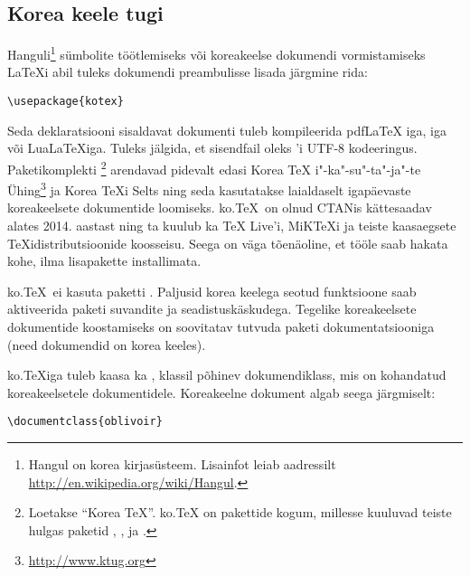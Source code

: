 \subsection[Korea keele tugi]{Korea keele tugi\footnotemark}\label{support_korean}%

Hanguli\footnote{Hangul on korea
kirjasüsteem. Lisainfot leiab aadressilt
\url{http://en.wikipedia.org/wiki/Hangul}.} sümbolite töötlemiseks või
koreakeelse dokumendi vormistamiseks \LaTeX i abil tuleks dokumendi
preambulisse lisada järgmine rida:

\begin{lscommand}
\verb|\usepackage{kotex}|
\end{lscommand}

Seda deklaratsiooni sisaldavat dokumenti tuleb kompileerida pdf\LaTeX
iga, iga või Lua\LaTeX iga. Tuleks jälgida, et
sisendfail oleks 'i UTF-8 kodeeringus. Paketikomplekti
\footnote{Loetakse "`Korea \TeX"'. ko.\TeX{} on pakettide kogum,
millesse kuuluvad teiste hulgas paketid , ,
 ja .} arendavad pidevalt edasi Korea \TeX
i"-ka"-su"-ta"-ja"-te Ühing\footnote{\url{http://www.ktug.org}} ja Korea
\TeX i Selts ning seda kasutatakse laialdaselt igapäevaste koreakeelsete
dokumentide loomiseks. ko.\TeX\ on olnud CTANis kättesaadav alates 2014.
aastast ning ta kuulub ka \TeX{} Live'i,
MiK\TeX i ja teiste kaasaegsete
\TeX idistributsioonide koosseisu. Seega on väga tõenäoline, et tööle
saab hakata kohe, ilma lisapakette installimata.

ko.\TeX\ ei kasuta paketti . Paljusid korea keelega seotud
funktsioone saab aktiveerida paketi  suvandite ja
seadistuskäskudega. Tegelike koreakeelsete dokumentide koostamiseks
on soovitatav tutvuda paketi dokumentatsiooniga (need dokumendid on
korea keeles).

ko.\TeX iga tuleb kaasa ka
, klassil
 põhinev dokumendiklass, mis on
kohandatud koreakeelsetele dokumentidele. Koreakeelne dokument algab
seega järgmiselt:

\begin{lscommand}
\verb|\documentclass{oblivoir}|
\end{lscommand}

